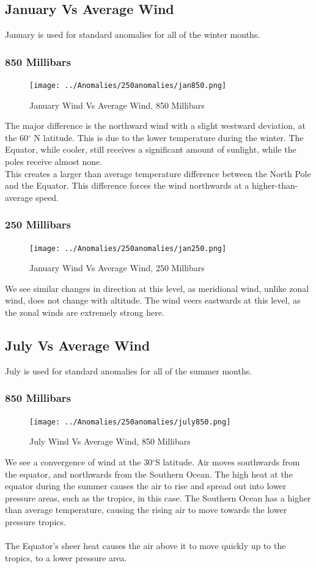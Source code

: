 \documentclass[hidelinks]{article}
\begin{document}
\subsection{January Vs Average Wind}
January is used for standard anomalies for all of the winter months.
\subsubsection{850 Millibars}
\begin{figure}[h!]
	\centering
	\texttt{[image: ../Anomalies/250anomalies/jan850.png]}
	\caption{January Wind Vs Average Wind, 850 Millibars}
\end{figure}
\newpage
\noindent The major difference is the northward wind with a slight westward deviation, at the 60$^\circ$ N latitude. This is due to the lower temperature during the winter. The Equator, while cooler, still receives a significant amount of sunlight, while the poles receive almost none.\\
This creates a larger than average temperature difference between the North Pole and the Equator. This difference forces the wind northwards at a higher-than-average speed.
\subsubsection{250 Millibars}
\begin{figure}[h!]
	\centering
	\texttt{[image: ../Anomalies/250anomalies/jan250.png]}
	\caption{January Wind Vs Average Wind, 250 Millibars}
\end{figure}
\noindent We see similar changes in direction at this level, as meridional wind, unlike zonal wind, does not change with altitude. The wind veers eastwards at this level, as the zonal winds are extremely strong here.
\newpage
\subsection{July Vs Average Wind}
July is used for standard anomalies for all of the summer months.
\subsubsection{850 Millibars}
\begin{figure}[h!]
	\centering
	\texttt{[image: ../Anomalies/250anomalies/july850.png]}
	\caption{July Wind Vs Average Wind, 850 Millibars}
\end{figure}
\noindent We see a convergence of wind at the 30$^\circ$S latitude. Air moves southwards from the equator, and northwards from the Southern Ocean. The high heat at the equator during the summer causes the air to rise and spread out into lower pressure areas, such as the tropics, in this case. The Southern Ocean has a higher than average temperature, causing the rising air to move towards the lower pressure tropics.  
\\\\
The Equator's sheer heat causes the air above it to move quickly up to the tropics, to a lower pressure area.
\end{document}
